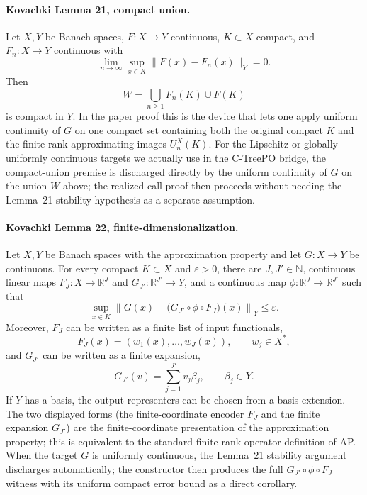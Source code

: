 \paragraph{Kovachki Lemma 21, compact union.}
Let $X,Y$ be Banach spaces, $F:X\to Y$ continuous, $K\subset X$
compact, and $F_n:X\to Y$ continuous with
\[
\lim_{n\to\infty}\sup_{x\in K}\|F(x)-F_n(x)\|_Y=0.
\]
Then
\[
W=\bigcup_{n\ge 1}F_n(K)\cup F(K)
\]
is compact in $Y$. In the paper proof this is the device that lets one
apply uniform continuity of $G$ on one compact set containing both the
original compact $K$ and the finite-rank approximating images
$U_n^X(K)$. For the Lipschitz or globally uniformly continuous targets
we actually use in the C-TreePO bridge, the compact-union premise is
discharged directly by the uniform continuity of $G$ on the union $W$
above; the realized-call proof then proceeds without needing the
Lemma~21 stability hypothesis as a separate assumption.

\paragraph{Kovachki Lemma 22, finite-dimensionalization.}
Let $X,Y$ be Banach spaces with the approximation property and let
$G:X\to Y$ be continuous. For every compact $K\subset X$ and
$\varepsilon>0$, there are $J,J'\in\mathbb{N}$, continuous linear maps
$F_J:X\to\mathbb{R}^{J}$ and $G_{J'}:\mathbb{R}^{J'}\to Y$, and a
continuous map $\phi:\mathbb{R}^{J}\to\mathbb{R}^{J'}$ such that
\[
\sup_{x\in K}
\left\|G(x)-\bigl(G_{J'}\circ\phi\circ F_J\bigr)(x)\right\|_Y
\le \varepsilon.
\]
Moreover, $F_J$ can be written as a finite list of input functionals,
\[
F_J(x)=(w_1(x),\ldots,w_J(x)),\qquad w_j\in X^\ast,
\]
and $G_{J'}$ can be written as a finite expansion,
\[
G_{J'}(v)=\sum_{j=1}^{J'}v_j\beta_j,\qquad \beta_j\in Y.
\]
If $Y$ has a basis, the output representers can be chosen from a basis
extension. The two displayed forms (the finite-coordinate encoder $F_J$
and the finite expansion $G_{J'}$) are the finite-coordinate
presentation of the approximation property; this is equivalent to the
standard finite-rank-operator definition of AP. When the target $G$ is
uniformly continuous, the Lemma~21 stability argument discharges
automatically; the constructor then produces the full
$G_{J'}\circ\phi\circ F_J$ witness with its uniform compact error bound
as a direct corollary.

